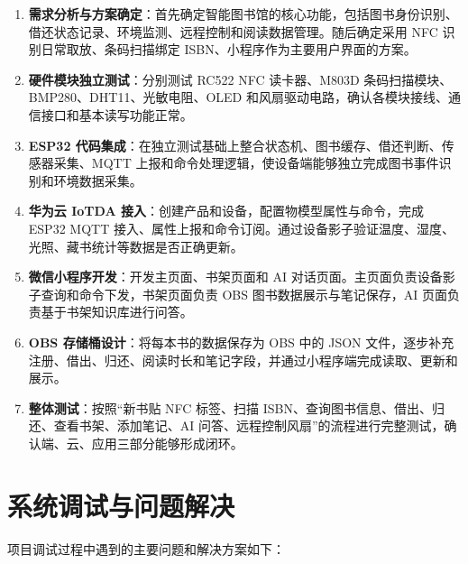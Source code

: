 \documentclass[12pt,hyperref,a4paper,UTF8]{ctexart}
\begin{document}
\begin{enumerate}
    \item \textbf{需求分析与方案确定}：首先确定智能图书馆的核心功能，包括图书身份识别、借还状态记录、环境监测、远程控制和阅读数据管理。随后确定采用 NFC 识别日常取放、条码扫描绑定 ISBN、小程序作为主要用户界面的方案。
    \item \textbf{硬件模块独立测试}：分别测试 RC522 NFC 读卡器、M803D 条码扫描模块、BMP280、DHT11、光敏电阻、OLED 和风扇驱动电路，确认各模块接线、通信接口和基本读写功能正常。
    \item \textbf{ESP32 代码集成}：在独立测试基础上整合状态机、图书缓存、借还判断、传感器采集、MQTT 上报和命令处理逻辑，使设备端能够独立完成图书事件识别和环境数据采集。
    \item \textbf{华为云 IoTDA 接入}：创建产品和设备，配置物模型属性与命令，完成 ESP32 MQTT 接入、属性上报和命令订阅。通过设备影子验证温度、湿度、光照、藏书统计等数据是否正确更新。
    \item \textbf{微信小程序开发}：开发主页面、书架页面和 AI 对话页面。主页面负责设备影子查询和命令下发，书架页面负责 OBS 图书数据展示与笔记保存，AI 页面负责基于书架知识库进行问答。
    \item \textbf{OBS 存储桶设计}：将每本书的数据保存为 OBS 中的 JSON 文件，逐步补充注册、借出、归还、阅读时长和笔记字段，并通过小程序端完成读取、更新和展示。
    \item \textbf{整体测试}：按照“新书贴 NFC 标签、扫描 ISBN、查询图书信息、借出、归还、查看书架、添加笔记、AI 问答、远程控制风扇”的流程进行完整测试，确认端、云、应用三部分能够形成闭环。
\end{enumerate}

\section{系统调试与问题解决}

项目调试过程中遇到的主要问题和解决方案如下：
\end{document}
